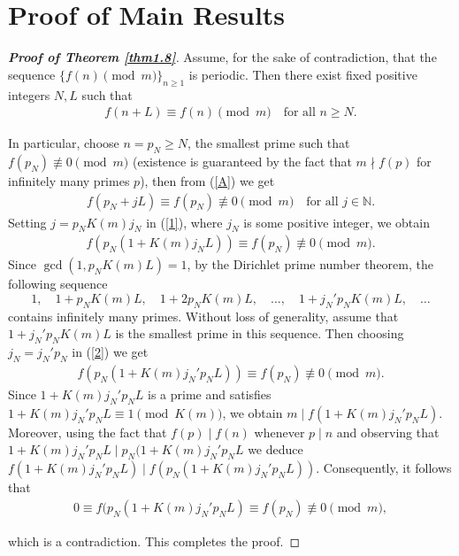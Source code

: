 \documentclass[12pt,reqno]{amsart}
\begin{document}
\section{Proof of Main Results}
\begin{proof}[\textbf{Proof of Theorem \ref{thm1.8}}]
Assume, for the sake of contradiction, that the sequence $\{f(n) \pmod{m}\}_{n\geq 1}$ is periodic. Then there exist fixed positive integers $N,L$ such that
\begin{align}\label{A}
f(n+L)\equiv f(n) \pmod{m}\quad \text{for all~}n\geq N.    
\end{align}

In particular, choose $n=p_N\geq N$, the smallest prime such that $f(p_N)\not\equiv 0\pmod{m}$  (existence is guaranteed by the fact that $m\nmid f(p)$ for infinitely many primes $p$), then from (\ref{A}) we get
\begin{align}\label{1}
f(p_N+jL)\equiv f(p_N)\not\equiv 0\pmod{m}\quad \text{for all~}j\in\mathbb{N}.    
\end{align}
Setting $j=p_NK(m)j_N$ in (\ref{1}), where $j_N$ is some positive integer, we obtain
\begin{align}\label{2}
f(p_N(1+K(m)j_NL))\equiv f(p_N)\not\equiv 0\pmod{m}.    
\end{align}
Since $\gcd(1,p_NK(m)L)=1$, by the Dirichlet prime number theorem, the following sequence
$$1, \quad 1+p_NK(m)L, \quad 1+2p_NK(m)L,\quad \ldots,\quad 1+j_N'p_NK(m)L,\quad \ldots$$
contains infinitely many primes. Without loss of generality, assume that $1+j_N'p_NK(m)L$ is the smallest prime in this sequence. Then choosing $j_N=j_N'p_N$ in (\ref{2}) we get
\begin{align}\label{eq3}
f(p_N(1+K(m)j_N'p_NL))\equiv f(p_N)\not\equiv 0\pmod{m}.    
\end{align}
Since $1+K(m)j_N'p_NL$ is a prime and satisfies $1+K(m)j_N'p_NL\equiv 1 \pmod{K(m)}$, we obtain  $m\mid f(1+K(m)j_N'p_NL)$. Moreover, using the fact that $f(p)\mid f(n)$ whenever $p\mid n$ and observing that $1+K(m)j_N'p_NL\mid p_N(1+K(m)j_N'p_NL$ we deduce  $f(1+K(m)j_N'p_NL)\mid f(p_N(1+K(m)j_N'p_NL))$. Consequently, it follows that
\begin{align}\label{1*}
 0\equiv f(p_N(1+K(m)j_N'p_NL)\equiv f(p_N)\not\equiv 0\pmod{m},   
\end{align}

which is a contradiction. This completes the proof.
\end{proof}
\end{document}
